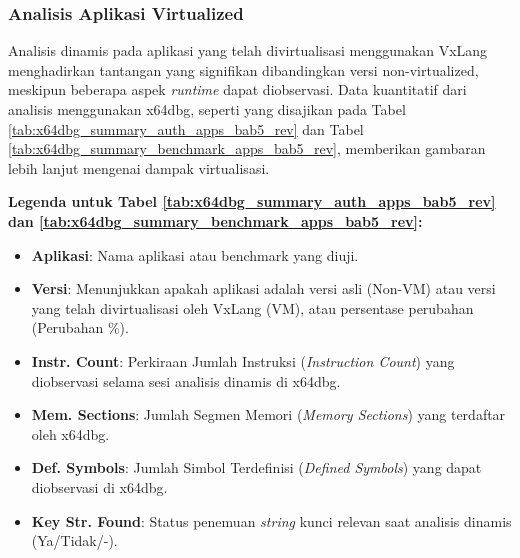 \subsubsection{Analisis Aplikasi Virtualized}

Analisis dinamis pada aplikasi yang telah divirtualisasi menggunakan VxLang menghadirkan tantangan yang signifikan dibandingkan versi non-virtualized, meskipun beberapa aspek \textit{runtime} dapat diobservasi. Data kuantitatif dari analisis menggunakan x64dbg, seperti yang disajikan pada Tabel \ref{tab:x64dbg_summary_auth_apps_bab5_rev} dan Tabel \ref{tab:x64dbg_summary_benchmark_apps_bab5_rev}, memberikan gambaran lebih lanjut mengenai dampak virtualisasi.

\noindent \textbf{Legenda untuk Tabel \ref{tab:x64dbg_summary_auth_apps_bab5_rev} dan \ref{tab:x64dbg_summary_benchmark_apps_bab5_rev}:}
\begin{itemize}
    \item \textbf{Aplikasi}: Nama aplikasi atau benchmark yang diuji.
    \item \textbf{Versi}: Menunjukkan apakah aplikasi adalah versi asli (Non-VM) atau versi yang telah divirtualisasi oleh VxLang (VM), atau persentase perubahan (Perubahan \%).
    \item \textbf{Instr. Count}: Perkiraan Jumlah Instruksi (\textit{Instruction Count}) yang diobservasi selama sesi analisis dinamis di x64dbg.
    \item \textbf{Mem. Sections}: Jumlah Segmen Memori (\textit{Memory Sections}) yang terdaftar oleh x64dbg.
    \item \textbf{Def. Symbols}: Jumlah Simbol Terdefinisi (\textit{Defined Symbols}) yang dapat diobservasi di x64dbg.
    \item \textbf{Key Str. Found}: Status penemuan \textit{string} kunci relevan saat analisis dinamis (Ya/Tidak/-).
\end{itemize}

